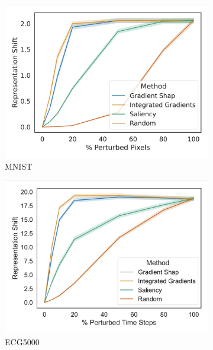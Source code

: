 \begin{figure}
     \centering
     \begin{subfigure}[b]{0.3\textwidth}
         \centering
         \includegraphics[width=\textwidth]{images/feature_consistency_mnist.png}
         \caption{MNIST}
         \label{fig:feature_consistency_mnist}
     \end{subfigure}
     \hfill
     \begin{subfigure}[b]{0.3\textwidth}
         \centering
         \includegraphics[width=\textwidth]{images/feature_consistency_ecg5000.png}
         \caption{ECG5000}
         \label{fig:feature_consistency_ecg}
     \end{subfigure}
     \hfill
     \begin{subfigure}[b]{0.3\textwidth}

\end{subfigure}
\end{figure}
